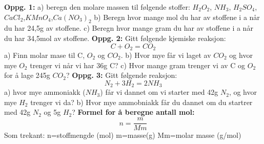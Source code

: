 \documentclass[12pt,a4paper]{article}
\begin{document}
\begin{center}
\end{center}\vspace{1cm}
\textbf{Oppg. 1:}\nl
a) beregn den molare massen til følgende stoffer:\nl
$H_2O_2$, $NH_3$, $H_2SO_4$,$CaCl_2$,$KMnO_4$,$Ca(NO_3)_2$\nl
b) Beregn hvor mange mol du har av stoffene i a når du har 24,5g av stoffene.\nl
c) Beregn hvor mange gram du har av stoffene i a når du har 34,5mol av stoffene.\nl
\textbf{Oppg. 2:}\nl
Gitt følgende kjemiske reaksjon:\nl
$$C+O_2=CO_2$$\nl
a) Finn molar mase til C, $O_2$ og $CO_2$.\nl
b) Hvor mye får vi laget av $CO_2$ og hvor mye $O_2$ trenger vi når vi har 36g C?\nl
c) Hvor mange gram trenger vi av C og $O_2$ for å lage 245g $CO_2$?\nl
\newpage
\textbf{Oppg. 3:}\nl
Gitt følgende reaksjon:
$$N_2+3H_2=2NH_3$$
a) hvor mye ammoniakk ($NH_3$) får vi dannet om vi starter med 42g $N_2$, og hvor mye $H_2$ trenger vi da?\nl
b) Hvor mye ammobniakk får du dannet om du startrer med 42g $N_2$ og 5g $H_2$?
\nl[5]
\textbf{Formel for å beregne antall mol:}\nl[2]
$$n=\frac{m}{Mm}$$
Som trekant:\nl
{}
n=stoffmengde (mol)\nl
m=masse(g)\nl
Mm=molar masse (g/mol)\nl
\end{document}
